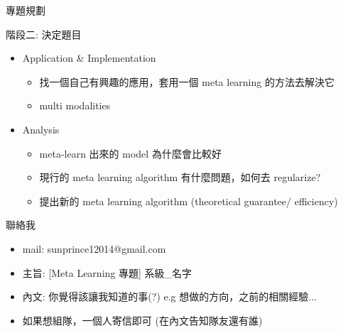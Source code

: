 \documentclass{beamer}
\begin{document}
\begin{frame}[t]{專題規劃}
  \begin{block}{階段二: 決定題目}
    \begin{itemize}
      \item Application \& Implementation
        \begin{itemize}
          \item 找一個自己有興趣的應用，套用一個 meta learning 的方法去解決它
          \item multi modalities
        \end{itemize}
      \item Analysis
        \begin{itemize}
          \item meta-learn 出來的 model 為什麼會比較好
          \item 現行的 meta learning algorithm 有什麼問題，如何去 regularize?
          \item 提出新的 meta learning algorithm (theoretical guarantee/ efficiency)
        \end{itemize}
    \end{itemize}
  \end{block}
\end{frame}

\begin{frame}[t]{聯絡我}
  \begin{itemize}
    \item mail: sunprince12014@gmail.com
    \item 主旨: [Meta Learning 專題] 系級\_名字
    \item 內文: 你覺得該讓我知道的事(?) e.g 想做的方向，之前的相關經驗...
    \item 如果想組隊，一個人寄信即可 (在內文告知隊友還有誰)
  \end{itemize}
\end{frame}



\end{document}
